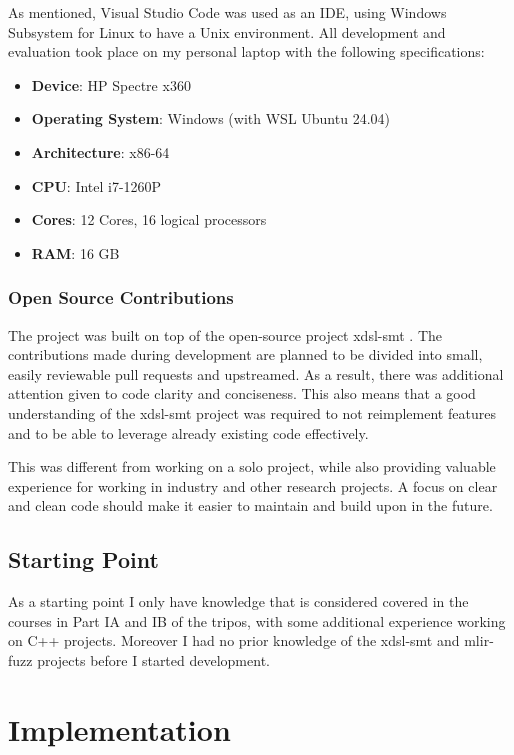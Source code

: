 As mentioned, Visual Studio Code was used as an IDE, using Windows Subsystem for Linux to have
a Unix environment. All development and evaluation took place on my personal laptop with the 
following specifications:

\begin{itemize}
\item \textbf{Device}: HP Spectre x360
\item \textbf{Operating System}: Windows (with WSL Ubuntu 24.04)
\item \textbf{Architecture}: x86-64
\item \textbf{CPU}: Intel i7-1260P
\item \textbf{Cores}: 12 Cores, 16 logical processors
\item \textbf{RAM}: 16 GB
\end{itemize}

\subsection{Open Source Contributions}

The project was built on top of the open-source project xdsl-smt \cite{xdsl-smt}.
The contributions made during development are planned to be divided into small, easily 
reviewable pull requests and upstreamed. As a result, there was additional attention 
given to code clarity and conciseness. This also means that a good understanding of the xdsl-smt
project was required to not reimplement features and to be able to leverage already existing code 
effectively.

This was different from working on a solo project, while also providing valuable experience
for working in industry and other research projects. A focus on clear and clean code should make
it easier to maintain and build upon in the future.

\section{Starting Point}

As a starting point I only have knowledge that is considered covered in the courses in Part IA and IB
of the tripos, with some additional experience working on C++ projects.
Moreover I had no prior knowledge of the xdsl-smt and mlir-fuzz projects before I started development.

\clearpage
\chapter{Implementation}
\label{ch:impl}


